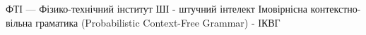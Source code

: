 ФТІ --- Фізико-технічний інститут
ШІ - штучний інтелект
Імовірнісна контекстно-вільна граматика (Probabilistic Context-Free Grammar) - ІКВГ 